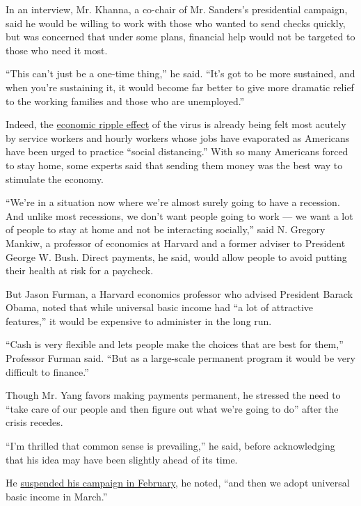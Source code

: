 In an interview, Mr. Khanna, a co-chair of Mr. Sanders's presidential
campaign, said he would be willing to work with those who wanted to send
checks quickly, but was concerned that under some plans, financial help
would not be targeted to those who need it most.

``This can't just be a one-time thing,'' he said. ``It's got to be more
sustained, and when you're sustaining it, it would become far better to
give more dramatic relief to the working families and those who are
unemployed.''

Indeed, the
\href{https://www.nytimes3xbfgragh.onion/2020/03/15/business/economy/coronavirus-economy-impact.html}{economic
ripple effect} of the virus is already being felt most acutely by
service workers and hourly workers whose jobs have evaporated as
Americans have been urged to practice ``social distancing.'' With so
many Americans forced to stay home, some experts said that sending them
money was the best way to stimulate the economy.

``We're in a situation now where we're almost surely going to have a
recession. And unlike most recessions, we don't want people going to
work --- we want a lot of people to stay at home and not be interacting
socially,'' said N. Gregory Mankiw, a professor of economics at Harvard
and a former adviser to President George W. Bush. Direct payments, he
said, would allow people to avoid putting their health at risk for a
paycheck.

But Jason Furman, a Harvard economics professor who advised President
Barack Obama, noted that while universal basic income had ``a lot of
attractive features,'' it would be expensive to administer in the long
run.

``Cash is very flexible and lets people make the choices that are best
for them,'' Professor Furman said. ``But as a large-scale permanent
program it would be very difficult to finance.''

Though Mr. Yang favors making payments permanent, he stressed the need
to ``take care of our people and then figure out what we're going to
do'' after the crisis recedes.

``I'm thrilled that common sense is prevailing,'' he said, before
acknowledging that his idea may have been slightly ahead of its time.

He
\href{https://www.nytimes3xbfgragh.onion/2020/02/11/us/politics/andrew-yang-drops-out.html}{suspended
his campaign in February}, he noted, ``and then we adopt universal basic
income in March.''

